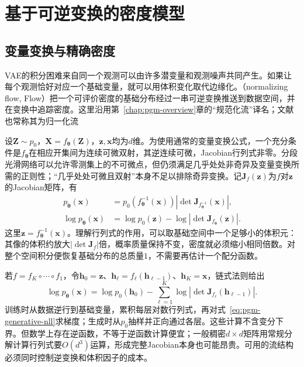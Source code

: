 \section{基于可逆变换的密度模型}
\label{sec:pgm-generative-flows}

\subsection{变量变换与精确密度}
\label{sec:pgm-generative-change-of-variables}

VAE的积分困难来自同一个观测可以由许多潜变量和观测噪声共同产生。如果让每个观测恰好对应一个基础变量，就可以用体积变化取代边缘化。（normalizing flow, Flow）把一个可评价密度的基础分布经过一串可逆变换推送到数据空间，并在变换中追踪密度。这里沿用第~\ref{chap:pgm-overview}章的“规范化流”译名；文献也常称其为归一化流

设$\bm{Z}\sim p_0$，$\bm{X}=f_{\bm{\theta}}(\bm{Z})$，$\bm{z},\bm{x}$均为$d$维。为使用通常的变量变换公式，一个充分条件是$f_{\bm{\theta}}$在相应开集间为连续可微双射，其逆连续可微，Jacobian行列式非零。分段光滑网络可以允许零测集上的不可微点，但仍须满足几乎处处非奇异及变量变换所需的正则性；“几乎处处可微且双射”本身不足以排除奇异变换。记$\bm{J}_{f}(\bm{z})$为$f$对$\bm{z}$的Jacobian矩阵，有
\begin{equation}
  \label{eq:pgm-generative-flow-density}
  \begin{aligned}
    p_{\bm{\theta}}(\bm{x})
      &=p_0(f_{\bm{\theta}}^{-1}(\bm{x}))
         \left|\det\bm{J}_{f_{\bm{\theta}}^{-1}}(\bm{x})\right|,\\
    \log p_{\bm{\theta}}(\bm{x})
      &=\log p_0(\bm{z})-
         \log\left|\det\bm{J}_{f_{\bm{\theta}}}(\bm{z})\right|.
  \end{aligned}
\end{equation}
这里$\bm{z}=f_{\bm{\theta}}^{-1}(\bm{x})$。理解行列式的作用，可以取基础空间中一个足够小的体积元：其像的体积约放大$|\det\bm{J}_f|$倍，概率质量保持不变，密度就必须缩小相同倍数。对整个空间积分便恢复基础分布的总质量$1$，不需要再估计一个配分函数。

若$f=f_K\circ\cdots\circ f_1$，令$\bm{h}_0=\bm{z}$、$\bm{h}_{\ell}=f_{\ell}(\bm{h}_{\ell-1})$、$\bm{h}_K=\bm{x}$，链式法则给出
\begin{equation}
  \label{eq:pgm-generative-flow-composition}
  \log p_{\bm{\theta}}(\bm{x})
  =\log p_0(\bm{h}_0)
   -\sum_{\ell=1}^{K}
      \log|\det\bm{J}_{f_{\ell}}(\bm{h}_{\ell-1})|.
\end{equation}
训练时从数据逆行到基础变量，累积每层对数行列式，再对式~\eqref{eq:pgm-generative-nll}求梯度；生成时从$p_0$抽样并正向通过各层。这些计算不含变分下界。但数学上存在逆函数，不等于逆函数计算便宜；一般稠密$d\times d$矩阵用常规分解计算行列式要$O(d^3)$运算，形成完整Jacobian本身也可能昂贵。可用的流结构必须同时控制逆变换和体积因子的成本。

